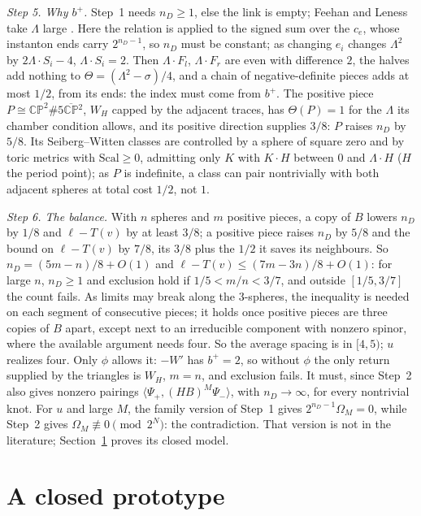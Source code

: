 \documentclass[10pt]{amsart}
\numberwithin{equation}{section}
\theoremstyle{compact}
\newcommand{\CP}{\mathbb{CP}}
\newcommand{\CPb}{\overline{\mathbb{CP}}{}^2}
\newcommand{\step}[1]{\par\noindent\textit{#1}\enspace}
\begin{document}
\step{Step 5. Why $b^+$.}
Step~1 needs $n_D\ge1$, else the link is empty; Feehan and Leness
take $\Lambda$ large \cite[Thm.~1]{FLM}. Here the relation is applied to the signed sum
over the $c_e$, whose instanton ends carry $2^{n_D-1}$, so $n_D$ must be constant; as changing $e_i$ changes $\Lambda^2$ by $2\Lambda\cdot
S_i-4$, $\Lambda\cdot S_i=2$. Then $\Lambda\cdot F_l$, $\Lambda\cdot F_r$ are
even with difference $2$, the halves add nothing to
$\Theta=(\Lambda^2-\sigma)/4$, and a chain of negative-definite pieces
adds at most $1/2$, from its ends: the index must come from $b^+$. The
positive piece $P\cong\CP^2\#5\CPb$, $W_H$ capped by the adjacent traces,
has $\Theta(P)=1$ for the $\Lambda$ its chamber condition allows, and its
positive direction supplies $3/8$: $P$ raises $n_D$ by $5/8$. Its
Seiberg--Witten classes are controlled by a sphere of square zero and by toric
metrics with $\mathrm{Scal}\ge0$, admitting only $K$ with $K\cdot H$ between
$0$ and $\Lambda\cdot H$ ($H$ the period point); as $P$ is indefinite, a class
can pair nontrivially with both adjacent spheres at total cost $1/2$, not $1$.

\step{Step 6. The balance.}
With $n$ spheres and $m$ positive pieces, a copy of $B$ lowers $n_D$ by
$1/8$ and $\ell-T(v)$ by at least $3/8$; a positive piece raises $n_D$ by
$5/8$ and the bound on $\ell-T(v)$ by $7/8$, its $3/8$ plus the $1/2$ it saves
its neighbours. So $n_D=(5m-n)/8+O(1)$ and $\ell-T(v)\le(7m-3n)/8+O(1)$: for
large $n$, $n_D\ge1$ and exclusion hold if $1/5<m/n<3/7$, and outside
$[1/5,3/7]$ the count fails. As limits may break along the $3$-spheres, the inequality is needed on
each segment of consecutive pieces; it holds once positive pieces are three
copies of $B$ apart, except next to an irreducible component with nonzero
spinor, where the available argument needs four. So the average spacing is
in $[4,5)$; $u$ realizes four. Only $\phi$ allows it: $-W'$ has
$b^+=2$, so without $\phi$ the only return supplied by the triangles is $W_H$,
$m=n$, and exclusion fails. It must, since Step~2 also gives nonzero pairings
$\langle\Psi_+,(HB)^M\Psi_-\rangle$, with $n_D\to\infty$, for every
nontrivial knot. For $u$ and large $M$, the family
version of Step~1 gives $2^{n_D-1}\Omega_M=0$, while Step~2 gives
$\Omega_M\not\equiv0\pmod{2^N}$: the contradiction. That version is not in
the literature; Section~\ref{sec:closed} proves its closed model.

\section{A closed prototype}\label{sec:closed}
\end{document}
